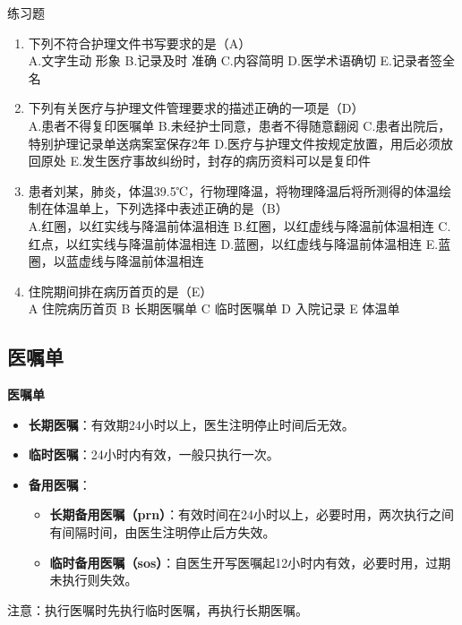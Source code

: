 \documentclass[11pt, a4paper]{ctexart}
\begin{document}
\begin{examplebox}{练习题}
\begin{enumerate}
    \item 下列不符合护理文件书写要求的是（A）\\
    A.文字生动 形象 \quad B.记录及时 准确 \quad C.内容简明 \quad D.医学术语确切 \quad E.记录者签全名
    \item 下列有关医疗与护理文件管理要求的描述正确的一项是（D）\\
    A.患者不得复印医嘱单 \quad B.未经护士同意，患者不得随意翻阅 \quad C.患者出院后，特别护理记录单送病案室保存2年 \quad D.医疗与护理文件按规定放置，用后必须放回原处 \quad E.发生医疗事故纠纷时，封存的病历资料可以是复印件
    \item 患者刘某，肺炎，体温39.5℃，行物理降温，将物理降温后将所测得的体温绘制在体温单上，下列选择中表述正确的是（B）\\
    A.红圈，以红实线与降温前体温相连 \quad B.红圈，以红虚线与降温前体温相连 \quad C.红点，以红实线与降温前体温相连 \quad D.蓝圈，以红虚线与降温前体温相连 \quad E.蓝圈，以蓝虚线与降温前体温相连
    \item 住院期间排在病历首页的是（E）\\
    A 住院病历首页 \quad B 长期医嘱单 \quad C 临时医嘱单 \quad D 入院记录 \quad E 体温单
\end{enumerate}
\end{examplebox}

\subsection{医嘱单}
\textbf{医嘱单}
\begin{itemize}
    \item \textbf{长期医嘱}：有效期24小时以上，医生注明停止时间后无效。
    \item \textbf{临时医嘱}：24小时内有效，一般只执行一次。
    \item \textbf{备用医嘱}：
    \begin{itemize}
        \item \textbf{长期备用医嘱（prn）}：有效时间在24小时以上，必要时用，两次执行之间有间隔时间，由医生注明停止后方失效。
        \item \textbf{临时备用医嘱（sos）}：自医生开写医嘱起12小时内有效，必要时用，过期未执行则失效。
    \end{itemize}
\end{itemize}
注意：执行医嘱时先执行临时医嘱，再执行长期医嘱。
\end{document}
